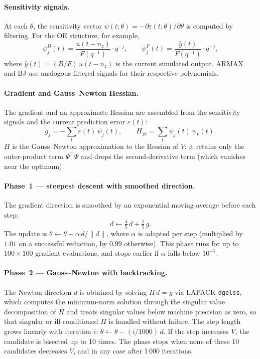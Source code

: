 \documentclass[11pt,a4paper]{article}
\begin{document}
\paragraph{Sensitivity signals.}
At each $\theta$, the sensitivity vector
$\psi(t;\theta) = -\partial\varepsilon(t;\theta)/\partial\theta$
is computed by filtering.  For the OE structure, for example,
\[
  \psi^B_j(t) = \frac{u(t-n_z)}{F(q^{-1})} \cdot q^{-j}, \qquad
  \psi^F_j(t) = \frac{\hat{y}(t)}{F(q^{-1})} \cdot q^{-j},
\]
where $\hat{y}(t) = (B/F)\,u(t-n_z)$ is the current simulated
output.  ARMAX and BJ use analogous filtered signals for their
respective polynomials.

\paragraph{Gradient and Gauss--Newton Hessian.}
The gradient and an approximate Hessian are assembled from the
sensitivity signals and the current prediction error $\varepsilon(t)$:
\[
  g_j = -\sum_t \varepsilon(t)\,\psi_j(t), \qquad
  H_{jk} = \sum_t \psi_j(t)\,\psi_k(t).
\]
$H$ is the Gauss--Newton approximation to the Hessian of $V$: it
retains only the outer-product term $\Psi^\top\Psi$ and drops the
second-derivative term (which vanishes near the optimum).

\paragraph{Phase~1 --- steepest descent with smoothed direction.}
The gradient direction is smoothed by an exponential moving average before each step:
\[
  d \leftarrow \tfrac{4}{5}\,d + \tfrac{1}{5}\,g.
\]
The update is $\theta \leftarrow \theta - \alpha\,d/\|d\|$, where
$\alpha$ is adapted per step (multiplied by $1.01$ on a successful
reduction, by $0.99$ otherwise).  This phase runs for up to
$100 \times 100$ gradient evaluations, and stops earlier if $\alpha$
falls below $10^{-7}$.

\paragraph{Phase~2 --- Gauss--Newton with backtracking.}
The Newton direction $d$ is obtained by solving $H\,d = g$ via
LAPACK \texttt{dgelss}, which computes the minimum-norm solution through
the singular value decomposition of $H$ and treats singular values
below machine precision as zero, so that singular or ill-conditioned
$H$ is handled without failure.  The step length grows linearly with
iteration $i$: $\theta \leftarrow \theta - (i/1000)\,d$.  If the step
increases $V$, the candidate is bisected up to 10 times.  The phase
stops when none of these 10 candidates decreases $V$, and in any case
after 1\,000 iterations.
\end{document}
